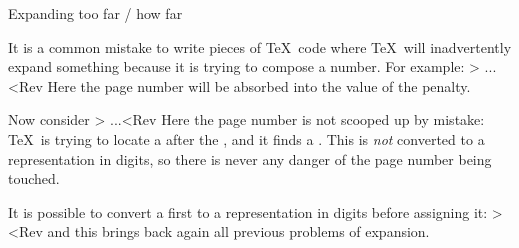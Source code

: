 \spoint Expanding too far / how far

It is a common mistake to write pieces of \TeX\ code
where \TeX\ will inadvertently expand something because it
is trying to compose a number. For example:
\Ver>\def\par{\endgraf{}}
...\par \number\pageno<Rev
Here the page number will be absorbed into the value of the penalty.

Now consider 
\Ver>\newcount\midpenalty {}
\def\par{\endgraf\penalty\midpenalty}
...\par \number\pageno<Rev
Here the page number is not scooped up by mistake:
\TeX\ is trying to locate a  after the ,
and it finds a . This is {\em not\/}
converted to a representation in digits, so there is never any
danger of the page number being touched.

It is possible to convert a  first to
a representation in digits before assigning it:
\Ver>\penalty\number\midpenalty<Rev
and this brings back again all previous problems of expansion.

\endinput





